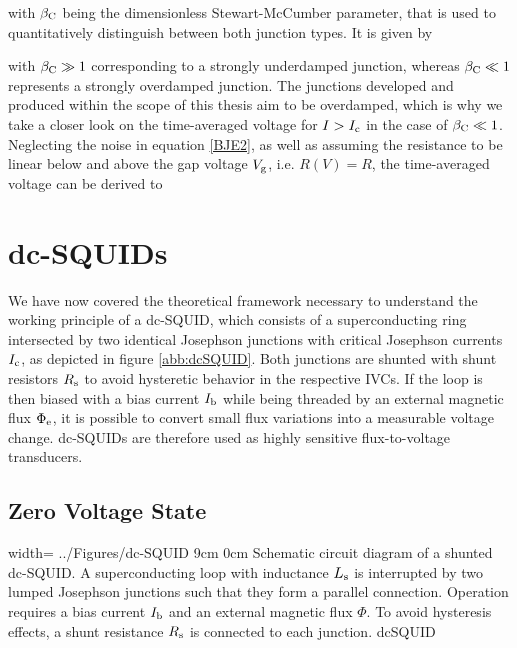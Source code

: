 
with $\beta_{\rm C}$ being the dimensionless Stewart-McCumber parameter, that is used to quantitatively distinguish between both junction types. It is given by 


with $\beta_{\rm C}\gg 1$ corresponding to a strongly underdamped junction, whereas $\beta_{\rm C}\ll 1$ represents a strongly overdamped junction. The junctions developed and produced within the scope of this thesis aim to be overdamped, which is why we take a closer look on the time-averaged voltage for $I>I_{\rm c}$ in the case of $ \beta_{\rm C}\ll 1$. Neglecting the noise in equation \ref{BJE2}, as well as assuming the resistance to be linear below and above the gap voltage $V_{\rm g}$, i.e. $R(V)=R$, the time-averaged voltage can be derived to 


\section{dc-SQUIDs}

We have now covered the theoretical framework necessary to understand the working principle of a dc-SQUID, which consists of a superconducting ring intersected by two identical Josephson junctions with critical Josephson currents $I_{\rm c}$, as depicted in figure \ref{abb:dcSQUID}. Both junctions are shunted with shunt resistors $R_{\rm s}$ to avoid hysteretic behavior in the respective IVCs. If the loop is then biased with a bias current $I_{\rm b}$ while being threaded by an external magnetic flux $\Phi_{\rm e}$, it is possible to convert small flux variations into a measurable voltage change. dc-SQUIDs are therefore used as highly sensitive flux-to-voltage transducers.

\subsection{Zero Voltage State}

{width=\textwidth} %
{../Figures/dc-SQUID}
{9cm} %
{0cm}
{Schematic circuit diagram of a shunted dc-SQUID. A superconducting loop with inductance $L_{\rm s}$ is interrupted by two lumped Josephson junctions such that they form a parallel connection. Operation requires a bias current $I_{\rm b}$ and an external magnetic flux $\Phi$. To avoid hysteresis effects, a shunt resistance $R_{\rm s}$ is connected to each junction.} 
{dcSQUID}

